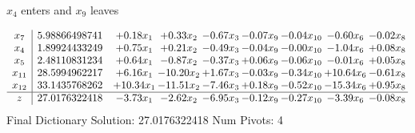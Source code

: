 \documentclass[9pt]{article}
\begin{document}
 $ x_{4} $ enters and $ x_{9} $ leaves 

 \[\begin{array}{c| c c@{\hskip 2pt} c@{\hskip 2pt} c@{\hskip 2pt} c@{\hskip 2pt} c@{\hskip 2pt} c@{\hskip 2pt} c@{\hskip 2pt} }
 x_{7}   &  5.98866498741 & +  0.18 x_{1} & +  0.33 x_{2} & -0.67 x_{3} & -0.07 x_{9} & -0.04 x_{10} & -0.60 x_{6} & -0.02 x_{8}\\
 x_{4}   &  1.89924433249 & +  0.75 x_{1} & +  0.21 x_{2} & -0.49 x_{3} & -0.04 x_{9} & -0.00 x_{10} & -1.04 x_{6} & +  0.08 x_{8}\\
 x_{5}   &  2.48110831234 & +  0.64 x_{1} & -0.87 x_{2} & -0.37 x_{3} & +  0.06 x_{9} & -0.06 x_{10} & -0.01 x_{6} & +  0.05 x_{8}\\
 x_{11}   &  28.5994962217 & +  6.16 x_{1} & -10.20 x_{2} & +  1.67 x_{3} & -0.03 x_{9} & -0.34 x_{10} & + 10.64 x_{6} & -0.61 x_{8}\\
 x_{12}   &  33.1435768262 & + 10.34 x_{1} & -11.51 x_{2} & -7.46 x_{3} & +  0.18 x_{9} & -0.52 x_{10} & -15.34 x_{6} & +  0.95 x_{8}\\
\hline
z    &  27.0176322418 & -3.73 x_{1} & -2.62 x_{2} & -6.95 x_{3} & -0.12 x_{9} & -0.27 x_{10} & -3.39 x_{6} & -0.08 x_{8}\\
\end{array}\]
Final Dictionary
Solution:  27.0176322418
Num Pivots:  4
\end{document}
